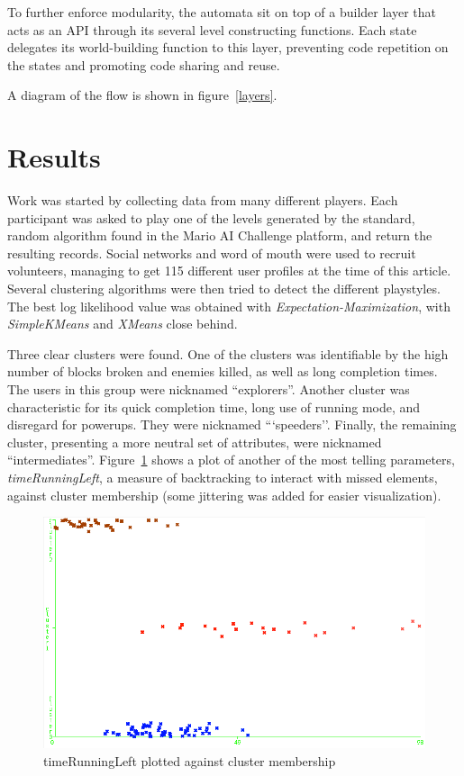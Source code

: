 \documentclass[conference]{IEEEtran}
\begin{document}
To further enforce modularity, the automata sit on top of a builder layer that acts as an API through its several level constructing functions. Each state delegates its world-building function to this layer, preventing code repetition on the states and promoting code sharing and reuse.

A diagram of the flow is shown in figure~\ref{layers}.

\section{Results}

Work was started by collecting data from many different players. Each participant was asked to play one of the levels generated by the standard, random algorithm found in the Mario AI Challenge platform, and return the resulting records. Social networks and word of mouth were used to recruit volunteers, managing to get 115 different user profiles at the time of this article. Several clustering algorithms were then tried to detect the different playstyles. The best log likelihood value was obtained with \textit{Expectation-Maximization}, with \textit{SimpleKMeans} and \textit{XMeans} close behind. 

Three clear clusters were found. One of the clusters was identifiable by the high number of blocks broken and enemies killed, as well as long completion times. The users in this group were nicknamed ``explorers''. Another cluster was characteristic for its quick completion time, long use of running mode, and disregard for powerups. They were nicknamed ```speeders''. Finally, the remaining cluster, presenting a more neutral set of attributes, were nicknamed ``intermediates''. Figure~\ref{wekaplot} shows a plot of another of the most telling parameters, \textit{timeRunningLeft}, a measure of backtracking to interact with missed elements, against cluster membership (some jittering was added for easier visualization).

\begin{figure}[htp]
\centerline{\includegraphics[width=0.75\columnwidth]{timeRunningLeft_.png}}
\caption{timeRunningLeft plotted against cluster membership}
\label{wekaplot}
\end{figure}
\end{document}

